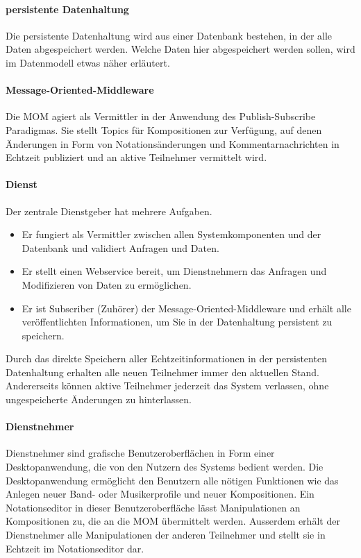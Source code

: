 \documentclass[12pt]{scrartcl}
\begin{document}
\paragraph{persistente Datenhaltung}
Die persistente Datenhaltung wird aus einer Datenbank bestehen, in der alle Daten abgespeichert werden. Welche Daten hier abgespeichert werden sollen, wird im Datenmodell etwas näher erläutert.

\paragraph{Message-Oriented-Middleware}
Die MOM agiert als Vermittler in der Anwendung des Publish-Subscribe Paradigmas. Sie stellt Topics für Kompositionen zur Verfügung, auf denen Änderungen in Form von Notationsänderungen und Kommentarnachrichten in Echtzeit publiziert und an aktive Teilnehmer vermittelt wird.

\paragraph{Dienst}
Der zentrale Dienstgeber hat mehrere Aufgaben.
\begin{itemize}
\item Er fungiert als Vermittler zwischen allen Systemkomponenten und der Datenbank und validiert Anfragen und Daten.
\item Er stellt einen Webservice bereit, um Dienstnehmern das Anfragen und Modifizieren von Daten zu ermöglichen.
\item Er ist Subscriber (Zuhörer) der Message-Oriented-Middleware und erhält alle veröffentlichten Informationen, um Sie in der Datenhaltung persistent zu speichern.
\end{itemize}

Durch das direkte Speichern aller Echtzeitinformationen in der persistenten Datenhaltung erhalten alle neuen Teilnehmer immer den aktuellen Stand. Andererseits können aktive Teilnehmer jederzeit das System verlassen, ohne ungespeicherte Änderungen zu hinterlassen.

\paragraph{Dienstnehmer}
Dienstnehmer sind grafische Benutzeroberflächen in Form einer Desktopanwendung, die von den Nutzern des Systems bedient werden. Die Desktopanwendung ermöglicht den Benutzern alle nötigen Funktionen wie das Anlegen neuer Band- oder Musikerprofile und neuer Kompositionen. Ein Notationseditor in dieser Benutzeroberfläche lässt Manipulationen an Kompositionen zu, die an die MOM übermittelt werden. Ausserdem erhält der Dienstnehmer alle Manipulationen der anderen Teilnehmer und stellt sie in Echtzeit im Notationseditor dar.
\end{document}
